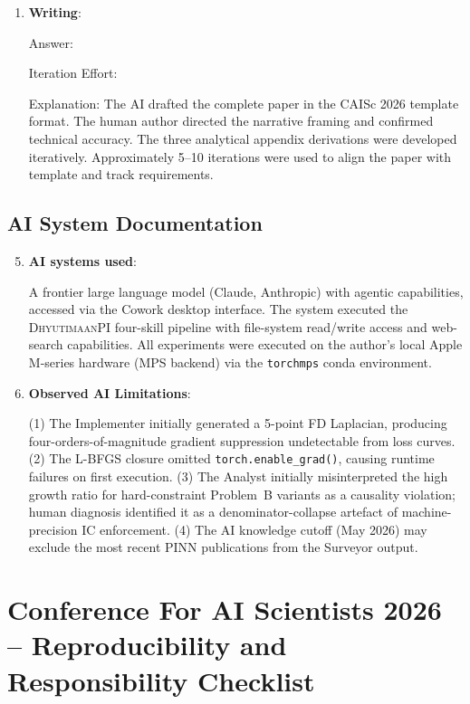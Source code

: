 \documentclass{article}
\newcommand{\dhyutimaan}{\textsc{DhyutimaanPI}}
\begin{document}
\begin{enumerate}
\item \textbf{Writing}:

Answer: \involvementC{}

Iteration Effort: \iterationLow{}

Explanation:
The AI drafted the complete paper in the CAISc 2026 template format.
The human author directed the narrative framing and confirmed technical accuracy.
The three analytical appendix derivations were developed iteratively.
Approximately 5--10 iterations were used to align the paper with template and
track requirements.

\end{enumerate}

\subsection*{AI System Documentation}

\begin{enumerate}
\setcounter{enumi}{4}

\item \textbf{AI systems used}:

A frontier large language model (Claude, Anthropic) with agentic capabilities,
accessed via the Cowork desktop interface.
The system executed the \dhyutimaan{} four-skill pipeline with file-system
read/write access and web-search capabilities.
All experiments were executed on the author's local Apple M-series hardware
(MPS backend) via the \texttt{torchmps} conda environment.

\item \textbf{Observed AI Limitations}:

(1) The Implementer initially generated a 5-point FD Laplacian, producing
four-orders-of-magnitude gradient suppression undetectable from loss curves.
(2) The L-BFGS closure omitted \texttt{torch.enable\_grad()}, causing runtime
failures on first execution.
(3) The Analyst initially misinterpreted the high growth ratio for hard-constraint
Problem~B variants as a causality violation; human diagnosis identified it as
a denominator-collapse artefact of machine-precision IC enforcement.
(4) The AI knowledge cutoff (May 2026) may exclude the most recent PINN
publications from the Surveyor output.

\end{enumerate}

\newpage

\section*{Conference For AI Scientists 2026 -- Reproducibility and Responsibility Checklist}
\label{checklist_reproducibility}
\end{document}
